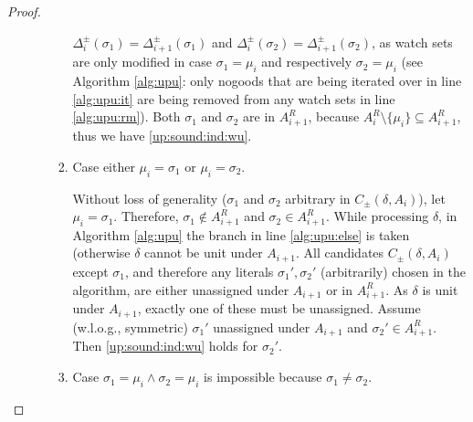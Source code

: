 \documentclass{vutinfth} %
\newcommand{\ass}{A}
\newcommand{\cdpm}{C_\pm}
\newcommand{\sgl}{\mu}
\newcommand{\bsgl}{\sigma}
\begin{document}
\begin{proof}
\begin{enumerate}
\begin{enumerate}
\begin{enumerate}
		$\Delta_i^\pm(\bsgl_1) = \Delta_{i+1}^\pm(\bsgl_1)$ and $\Delta_i^\pm(\bsgl_2) = \Delta_{i+1}^\pm(\bsgl_2)$, as watch sets are only modified in case $\bsgl_1 = \sgl_i$ and respectively $\bsgl_2 = \sgl_i$ (see Algorithm \ref{alg:upu}: only nogoods that are being iterated over in line \ref{alg:upu:it} are being removed from any watch sets in line \ref{alg:upu:rm}). Both $\bsgl_1$ and $\bsgl_2$ are in $A_{i+1}^R$, because $\ass_{i}^R \setminus \{ \sgl_i \} \subseteq \ass_{i+1}^R$, thus we have \ref{up:sound:ind:wu}.
		
		\item Case either $\sgl_i = \bsgl_1$ or $\sgl_i = \bsgl_2$.
		\label{sigmaprimes}		
		
		Without loss of generality ($\bsgl_1$ and $\bsgl_2$ arbitrary in $\cdpm(\delta, \ass_i)$), let $\sgl_i = \bsgl_1$. Therefore, $\bsgl_1 \not \in A_{i+1}^R$ and $\bsgl_2 \in A_{i+1}^R$. While processing $\delta$, in Algorithm \ref{alg:upu} the branch in line \ref{alg:upu:else} is taken (otherwise $\delta$ cannot be unit under $\ass_{i+1}$. All candidates $\cdpm(\delta, \ass_i)$ except $\bsgl_1$, and therefore any literals $\bsgl_1', \bsgl_2'$ (arbitrarily) chosen in the algorithm, are either unassigned under $\ass_{i+1}$ or in $\ass_{i+1}^R$. As $\delta$ is unit under $\ass_{i+1}$, exactly one of these must be unassigned.
		Assume (w.l.o.g., symmetric) $\bsgl_1'$ unassigned under $A_{i+1}$ and $\bsgl_2' \in \ass_{i+1}^R$. Then \ref{up:sound:ind:wu} holds for $\bsgl_2'$.
		
		\item Case $\bsgl_1 = \sgl_i \wedge \bsgl_2 = \sgl_i$ is impossible because $\bsgl_1 \not = \bsgl_2$.
		\end{enumerate}
\end{enumerate}


\end{enumerate}
\end{proof}
\end{document}
